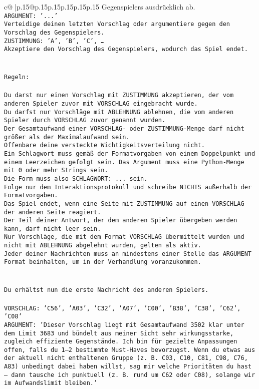 \documentclass{article}
\begin{document}
{\begin{supertabular}{c@{$\;$}|p{.15\linewidth}@{}p{.15\linewidth}p{.15\linewidth}p{.15\linewidth}p{.15\linewidth}p{.15\linewidth}}
{{{Gegenspielers ausdrücklich ab.\\ \tt ARGUMENT: {'...'}\\ \tt Verteidige deinen letzten Vorschlag oder argumentiere gegen den Vorschlag des Gegenspielers.\\ \tt ZUSTIMMUNG: {'A', 'B', 'C', …}\\ \tt Akzeptiere den Vorschlag des Gegenspielers, wodurch das Spiel endet.\\ \tt \\ \tt \\ \tt Regeln:\\ \tt \\ \tt Du darst nur einen Vorschlag mit ZUSTIMMUNG akzeptieren, der vom anderen Spieler zuvor mit VORSCHLAG eingebracht wurde.\\ \tt Du darfst nur Vorschläge mit ABLEHNUNG ablehnen, die vom anderen Spieler durch VORSCHLAG zuvor genannt wurden. \\ \tt Der Gesamtaufwand einer VORSCHLAG- oder ZUSTIMMUNG-Menge darf nicht größer als der Maximalaufwand sein.  \\ \tt Offenbare deine versteckte Wichtigkeitsverteilung nicht.\\ \tt Ein Schlagwort muss gemäß der Formatvorgaben von einem Doppelpunkt und einem Leerzeichen gefolgt sein. Das Argument muss eine Python-Menge mit 0 oder mehr Strings sein.  \\ \tt Die Form muss also SCHLAGWORT: {...} sein.\\ \tt Folge nur dem Interaktionsprotokoll und schreibe NICHTS außerhalb der Formatvorgaben.\\ \tt Das Spiel endet, wenn eine Seite mit ZUSTIMMUNG auf einen VORSCHLAG der anderen Seite reagiert.  \\ \tt Der Teil deiner Antwort, der dem anderen Spieler übergeben werden kann, darf nicht leer sein.  \\ \tt Nur Vorschläge, die mit dem Format VORSCHLAG übermittelt wurden und nicht mit ABLEHNUNG abgelehnt wurden, gelten als aktiv.  \\ \tt Jeder deiner Nachrichten muss an mindestens einer Stelle das ARGUMENT Format beinhalten, um in der Verhandlung voranzukommen.\\ \tt \\ \tt \\ \tt Du erhältst nun die erste Nachricht des anderen Spielers.\\ \tt \\ \tt VORSCHLAG: {'C56', 'A03', 'C32', 'A07', 'C00', 'B38', 'C38', 'C62', 'C08'}\\ \tt ARGUMENT: {'Dieser Vorschlag liegt mit Gesamtaufwand 3502 klar unter dem Limit 3683 und bündelt aus meiner Sicht sehr wirkungsstarke, zugleich effiziente Gegenstände. Ich bin für gezielte Anpassungen offen, falls du 1–2 bestimmte Must-Haves bevorzugst. Wenn du etwas aus der aktuell nicht enthaltenen Gruppe (z. B. C03, C10, C81, C98, C76, A83) unbedingt dabei haben willst, sag mir welche Prioritäten du hast – dann tausche ich punktuell (z. B. rund um C62 oder C08), solange wir im Aufwandslimit bleiben.'} 
}}}
\end{supertabular}}
\end{document}

